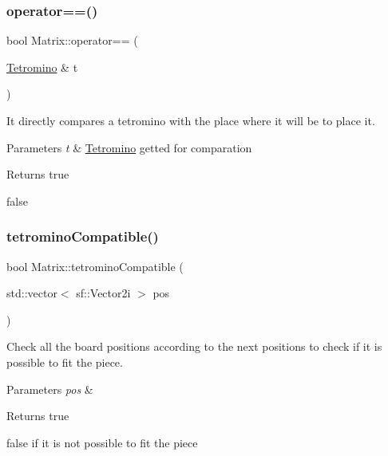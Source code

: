 \subsubsection{\texorpdfstring{operator==()}{operator==()}}
{\footnotesize\ttfamily bool Matrix\+::operator== (\begin{DoxyParamCaption}\item[{\hyperlink{classTetromino}{Tetromino} \&}]{t }\end{DoxyParamCaption})}



It directly compares a tetromino with the place where it will be to place it. 


\begin{DoxyParams}{Parameters}
{\em t} & \hyperlink{classTetromino}{Tetromino} getted for comparation \\
\hline
\end{DoxyParams}
\begin{DoxyReturn}{Returns}
true 

false 
\end{DoxyReturn}
\mbox{\label{classMatrix_a2f7248b95312e5ecabeab518cd584774}} 
\subsubsection{\texorpdfstring{tetromino\+Compatible()}{tetrominoCompatible()}}
{\footnotesize\ttfamily bool Matrix\+::tetromino\+Compatible (\begin{DoxyParamCaption}\item[{std\+::vector$<$ sf\+::\+Vector2i $>$}]{pos }\end{DoxyParamCaption})}



Check all the board positions according to the next positions to check if it is possible to fit the piece. 


\begin{DoxyParams}{Parameters}
{\em pos} & \\
\hline
\end{DoxyParams}
\begin{DoxyReturn}{Returns}
true 

false if it is not possible to fit the piece 
\end{DoxyReturn}
\mbox{\label{classMatrix_abd7645de0cb39d103a96c0f905a1cebe}} 
